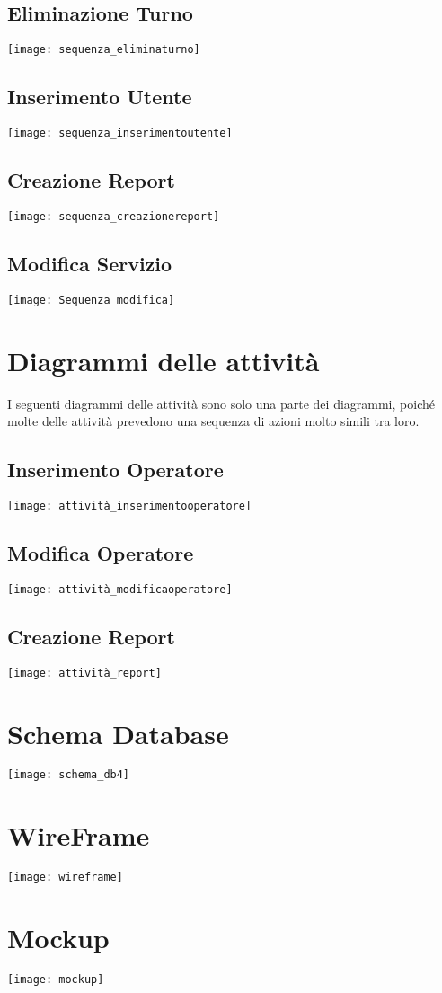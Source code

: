 \documentclass[green, fancy, 11pt]{elegantbook}
\begin{document}
\subsection{Eliminazione Turno}
\noindent \texttt{[image: sequenza\_eliminaturno]}
\newpage
\subsection{Inserimento Utente}
\noindent \texttt{[image: sequenza\_inserimentoutente]}
\subsection{Creazione Report}
\noindent \texttt{[image: sequenza\_creazionereport]}
\newpage
\subsection{Modifica Servizio}
\noindent \texttt{[image: Sequenza\_modifica]}
\newpage

\section{Diagrammi delle attività}
\noindent  I seguenti diagrammi delle attività sono solo una parte dei diagrammi, poiché molte delle attività prevedono una sequenza di azioni molto simili tra loro.
{\center
\subsection{Inserimento Operatore}
\noindent \texttt{[image: attività\_inserimentooperatore]}
\newpage
\subsection{Modifica Operatore}
\noindent \texttt{[image: attività\_modificaoperatore]}
\newpage
\subsection{Creazione Report}
\noindent \texttt{[image: attività\_report]}
\newpage
}

\section{Schema Database}
\noindent \texttt{[image: schema\_db4]}

\newpage
\section{WireFrame}
\noindent \texttt{[image: wireframe]}

\newpage
\section{Mockup}
\noindent \texttt{[image: mockup]}
\end{document}
